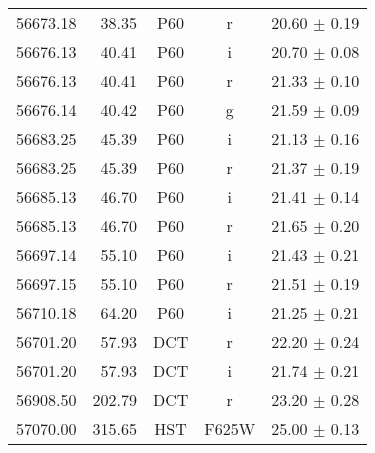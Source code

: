 \begin{tabular}{crccc}
    56673.18  &   38.35  &       P60  &   r  &     20.60 $\pm$ 0.19 \\
    56676.13  &   40.41  &       P60  &   i  &     20.70 $\pm$ 0.08 \\
    56676.13  &   40.41  &       P60  &   r  &     21.33 $\pm$ 0.10 \\
    56676.14  &   40.42  &       P60  &   g  &     21.59 $\pm$ 0.09 \\
    56683.25  &   45.39  &       P60  &   i  &     21.13 $\pm$ 0.16 \\
    56683.25  &   45.39  &       P60  &   r  &     21.37 $\pm$ 0.19 \\
    56685.13  &   46.70  &       P60  &   i  &     21.41 $\pm$ 0.14 \\
    56685.13  &   46.70  &       P60  &   r  &     21.65 $\pm$ 0.20 \\
    56697.14  &   55.10  &       P60  &   i  &     21.43 $\pm$ 0.21 \\
    56697.15  &   55.10  &       P60  &   r  &     21.51 $\pm$ 0.19 \\
    56710.18  &   64.20  &       P60  &   i  &     21.25 $\pm$ 0.21 \\
    56701.20  &   57.93  &       DCT  &   r  &     22.20 $\pm$ 0.24 \\
    56701.20  &   57.93  &       DCT  &   i  &     21.74 $\pm$ 0.21 \\
    56908.50  &  202.79  &       DCT  &   r  &     23.20 $\pm$ 0.28 \\
    57070.00  &  315.65  &       HST  & F625W&     25.00 $\pm$ 0.13 \\
\end{tabular}
